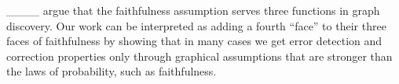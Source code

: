____ argue that the faithfulness assumption serves three functions in graph discovery.
Our work can be interpreted as adding a fourth \enquote{face} to their three faces of faithfulness by showing that in many cases we get error detection and correction properties only through graphical assumptions that are stronger than the laws of probability, such as faithfulness.
